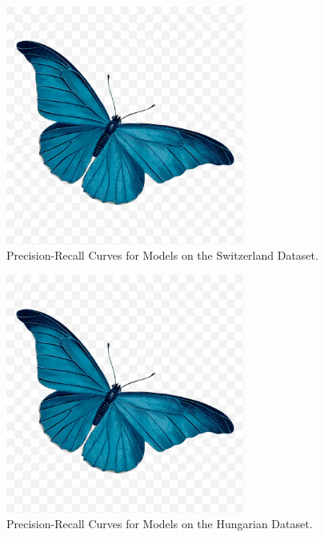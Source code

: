 \documentclass{article}
\begin{document}
\begin{figure}[htbp] %
    \centering
    \includegraphics[width=0.7\textwidth]{pr-curve-switzerland.png}
    \caption{Precision-Recall Curves for Models on the Switzerland Dataset.}
    \label{fig:pr_switzerland}
\end{figure}

\begin{figure}[htbp] %
    \centering
    \includegraphics[width=0.7\textwidth]{pr-curve-hungarian.png}
    \caption{Precision-Recall Curves for Models on the Hungarian Dataset.}
    \label{fig:pr_hungarian}
\end{figure}
\end{document}
